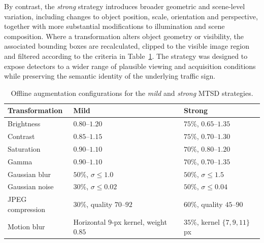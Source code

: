 By contrast, the \emph{strong} strategy introduces broader geometric and scene-level variation, including changes to object position, scale, orientation and perspective, together with more substantial modifications to illumination and scene composition. Where a transformation alters object geometry or visibility, the associated bounding boxes are recalculated, clipped to the visible image region and filtered according to the criteria in Table~\ref{tab:mtsd-augmentation}. The strategy was designed to expose detectors to a wider range of plausible viewing and acquisition conditions while preserving the semantic identity of the underlying traffic sign.

\begin{table}[h]
\centering
\caption{Offline augmentation configurations for the \emph{mild} and \emph{strong} \gls{MTSD} strategies.}
\label{tab:mtsd-augmentation}

\normalsize
\renewcommand{\arraystretch}{1.04}
\setlength{\tabcolsep}{4pt}

\begin{tabularx}{\textwidth}{
    @{}
    >{\raggedright\arraybackslash}p{3.4cm}
    >{\raggedright\arraybackslash}p{4.3cm}
    >{\raggedright\arraybackslash}X
    @{}
}
\toprule
\textbf{Transformation} & \textbf{Mild} & \textbf{Strong} \\
\midrule

Brightness
& \(0.80\)--\(1.20\)
& \(75\%\), \(0.65\)--\(1.35\) \\

Contrast
& \(0.85\)--\(1.15\)
& \(75\%\), \(0.70\)--\(1.30\) \\

Saturation
& \(0.90\)--\(1.10\)
& \(70\%\), \(0.80\)--\(1.20\) \\

Gamma
& \(0.90\)--\(1.10\)
& \(70\%\), \(0.70\)--\(1.35\) \\

\addlinespace[0.15em]

Gaussian blur
& \(50\%\), \(\sigma \leq 1.0\)
& \(50\%\), \(\sigma \leq 1.5\) \\

Gaussian noise
& \(30\%\), \(\sigma \leq 0.02\)
& \(50\%\), \(\sigma \leq 0.04\) \\

JPEG compression
& \(30\%\), quality \(70\)--\(92\)
& \(60\%\), quality \(45\)--\(90\) \\

Motion blur
& Horizontal \(9\)-px kernel, weight \(0.85\)
& \(35\%\), kernel \(\{7,9,11\}\) px \\


\end{tabularx}
\end{table}
